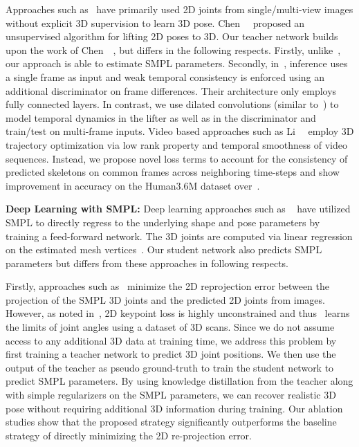 \documentclass[10pt,twocolumn,letterpaper]{article}
\begin{document}
Approaches such as~\cite{chingCVPR2019,Rhodin_2018_ECCV,wang2019distill} have primarily used 2D joints from single/multi-view images without explicit 3D supervision to learn 3D pose. Chen~\etal~\cite{chingCVPR2019} proposed an unsupervised algorithm for lifting 2D poses to 3D. 
Our teacher network builds upon the work of Chen~\etal~\cite{chingCVPR2019}, but differs in the following respects. Firstly, unlike~\cite{chingCVPR2019}, our approach is able to estimate SMPL parameters. Secondly, in~\cite{chingCVPR2019}, inference uses a single frame as input and weak temporal consistency is enforced using an additional discriminator on frame differences. Their architecture only employs fully connected layers. In contrast, we use dilated convolutions (similar to~\cite{pavllo20193d}) to model temporal dynamics in the lifter as well as in the discriminator and train/test on multi-frame inputs. Video based approaches such as Li~\etal~\cite{LiBoostingICCV19} employ 3D trajectory optimization via low rank property and temporal smoothness of video sequences. Instead, we propose novel loss terms to account for the consistency of predicted skeletons on common frames across neighboring time-steps and show improvement in accuracy on the Human3.6M dataset over~\cite{chingCVPR2019}. 

\noindent\textbf{Deep Learning with SMPL:} 
Deep learning approaches such as ~\cite{arnab2019exploiting,kanazawa2018end,SPIN_ICCV2019,madadi2018smplr,omran2018neural,TexturePoseICCV19,pavlakos2018humanshape,SunHMRICCV19,varol2018bodynet} have utilized SMPL to directly regress to the underlying shape and pose parameters by training a feed-forward network. The 3D joints are computed via linear regression on the estimated mesh vertices~\cite{kanazawa2018end}. Our student network also predicts SMPL parameters but differs from these approaches in following respects. 

Firstly, approaches such as~\cite{kanazawa2018end} minimize the 2D reprojection error between the projection of the SMPL 3D joints and the predicted 2D joints from images. However, as noted in~\cite{kanazawa2018end}, 2D keypoint loss is highly unconstrained and thus~\cite{kanazawa2018end} learns the limits of joint angles using a dataset of 3D scans. Since we do not assume access to any additional 3D data at training time, we address this problem by first training a teacher network to predict 3D joint positions. We then use the output of the teacher as pseudo ground-truth to train the student network to predict SMPL parameters. By using knowledge distillation from the teacher along with simple regularizers on the SMPL parameters, we can recover realistic 3D pose without requiring additional 3D information during training. Our ablation studies show that the proposed strategy significantly outperforms the baseline strategy of directly minimizing the 2D re-projection error. 
\end{document}
